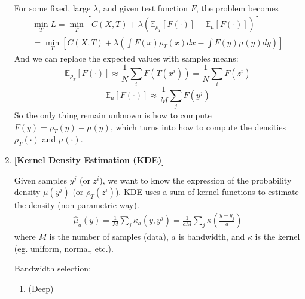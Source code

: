 \documentclass[11pt]{article}
\begin{document}
\begin{enumerate}
    For some fixed, large $\lambda$, and given test function $F$, the problem becomes
    \begin{align}
    \label{eq3}
        \min_T L 
        = \min_T \left[C(X,T) + \lambda (\mathbb{E}_{\rho_{T}} [F(\cdot)] - \mathbb{E}_{\mu} [F(\cdot)]) \right]\\
        = \min_T \left[C(X,T) + \lambda (\int F(x)\rho_T(x) dx - \int F(y)\mu(y) dy) \right]
    \end{align}
    And we can replace the expected values with samples means:
    $$
    \mathbb{E}_{\rho_{T}} [F(\cdot)] \approx \frac{1}{N} \sum_i F(T(x^i))
    = \frac{1}{N} \sum_i F(z^i)
    $$
    $$
    \mathbb{E}_{\mu} [F(\cdot)] \approx \frac{1}{M} \sum_j F(y^j)
    $$
    So the only thing remain unknown is how to compute $F(y) = \rho_T(y) - \mu(y)$, which turns into how to compute the densities $\rho_T(\cdot)$ and $\mu(\cdot)$.
    
    \item {\bf [Kernel Density Estimation (KDE)]}
    
    Given samples $y^j$ (or $z^i$), we want to know the expression of the probability density $\mu(y^j)$ (or $\rho_T(z^i)$). KDE uses a sum of kernel functions to estimate the density (non-parametric way).
    \begin{align*}
        \hat{\mu}_a(y) = \frac{1}{M} \sum_j \kappa_a(y,y^j)
        = \frac{1}{aM} \sum_j \kappa(\frac{y-y_j}{a})
    \end{align*}
    where $M$ is the number of samples (data), $a$ is bandwidth, and $\kappa$ is the kernel (eg. uniform, normal, etc.).
    
    Bandwidth selection:
    \begin{enumerate}
        \item (Deep)
        

\end{enumerate}
\end{enumerate}
\end{document}
